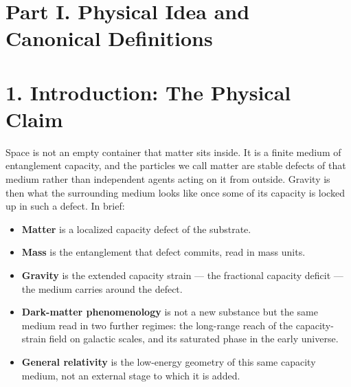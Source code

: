 \documentclass[11pt]{article}
\begin{document}
\begin{abstract}
\indent We also test the cell model directly, on a computer simulation of dynamical spacetime. Turning on the medium's weighting leaves the background geometry undisturbed, as the theory requires. Defects placed by hand then strain the nearby capacity and bend the local geometry, while a scrambled control leaves it flat. We can also predict, ahead of the run, one number the medium should shift in the simulation; the measured shift matches the prediction across a wide range of settings, and the control matches a different prediction of its own. This is early work at a single scale, and the parts that bear most on gravity are still being measured, but the medium and a standard model of dynamical geometry are now linked by a prediction that held, not by analogy.

\indent Beyond the static weak-field sector, the framework extends to time-dependent transport, clusters, cosmology, the saturated early universe, black holes, and the charged-lepton spectrum, at varying and explicitly labeled levels of closure. The completed claim of the paper is the chain from the microscopic construction to ordinary weak gravity; the later sectors are presented as conditional extensions, frontier completions, or open tests.
\end{abstract}

\clearpage
\tableofcontents
\newpage

\section*{Part I. Physical Idea and Canonical Definitions}

\section{1. Introduction: The Physical Claim}

Space is not an empty container that matter sits inside. It is a finite medium of entanglement capacity, and the particles we call matter are stable defects of that medium rather than independent agents acting on it from outside. Gravity is then what the surrounding medium looks like once some of its capacity is locked up in such a defect. In brief:
\begin{itemize}
\item \textbf{Matter} is a localized capacity defect of the substrate.
\item \textbf{Mass} is the entanglement that defect commits, read in mass units.
\item \textbf{Gravity} is the extended capacity strain --- the fractional capacity deficit --- the medium carries around the defect.
\item \textbf{Dark-matter phenomenology} is not a new substance but the same medium read in two further regimes: the long-range reach of the capacity-strain field on galactic scales, and its saturated phase in the early universe.
\item \textbf{General relativity} is the low-energy geometry of this same capacity medium, not an external stage to which it is added.
\end{itemize}
\end{document}
